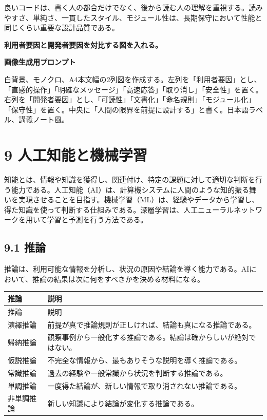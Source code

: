 \documentclass[a4paper,11pt]{ltjsarticle}
\begin{document}
良いコードは、書く人の都合だけでなく、後から読む人の理解を重視する。読みやすさ、単純さ、一貫したスタイル、モジュール性は、長期保守において性能と同じくらい重要な設計品質である。

\begin{todobox}
\textbf{利用者要因と開発者要因を対比する図を入れる。}\par
\textbf{画像生成用プロンプト}\par
白背景、モノクロ、A4本文幅の2列図を作成する。左列を「利用者要因」とし、「直感的操作」「明確なメッセージ」「高速応答」「取り消し」「安全性」を置く。右列を「開発者要因」とし、「可読性」「文書化」「命名規則」「モジュール化」「保守性」を置く。中央に「人間の限界を前提に設計する」と書く。日本語ラベル、講義ノート風。

\end{todobox}

\section{9 人工知能と機械学習}

知能とは、情報や知識を獲得し、関連付け、特定の課題に対して適切な判断を行う能力である。人工知能（AI）は、計算機システムに人間のような知的振る舞いを実現させることを目指す。機械学習（ML）は、経験やデータから学習し、得た知識を使って判断する仕組みである。深層学習は、人工ニューラルネットワークを用いて学習と予測を行う方法である。

\subsection{9.1 推論}

推論は、利用可能な情報を分析し、状況の原因や結論を導く能力である。AIにおいて、推論の結果は次に何をすべきかを決める材料になる。

\begin{longtable}{>{\raggedright\arraybackslash}p{}>{\raggedright\arraybackslash}p{}}
\toprule
推論 & 説明 \\
\midrule
\endfirsthead
\toprule
推論 & 説明 \\
\midrule
\endhead
演繹推論 & 前提が真で推論規則が正しければ、結論も真になる推論である。 \\
帰納推論 & 観察事例から一般化する推論である。結論は確からしいが絶対ではない。 \\
仮説推論 & 不完全な情報から、最もありそうな説明を導く推論である。 \\
常識推論 & 過去の経験や一般常識から状況を判断する推論である。 \\
単調推論 & 一度得た結論が、新しい情報で取り消されない推論である。 \\
非単調推論 & 新しい知識により結論が変化する推論である。 \\
\bottomrule
\end{longtable}
\end{document}

